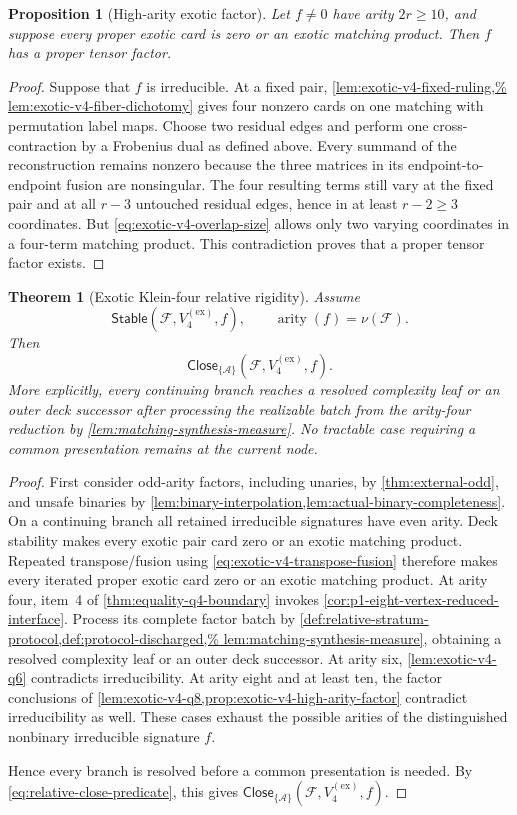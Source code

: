 \documentclass[11pt,letterpaper,onecolumn]{article}
\theoremstyle{plain}
\newtheorem{theorem}{Theorem}[section]
\newtheorem{proposition}[proposition]{Proposition}
\theoremstyle{definition}
\theoremstyle{remark}
\newcommand{\cF}{\mathcal F}
\newcommand{\cA}{\mathscr A}
\newcommand{\KleinEx}{{V_4^{(\mathrm{ex})}}}
\newcommand{\Stable}{\mathsf{Stable}}
\newcommand{\Close}{\mathsf{Close}}
\newcommand{\arity}{\operatorname{arity}}
\begin{document}
\begin{proposition}[High-arity exotic factor]
\label{prop:exotic-v4-high-arity-factor}
Let \(f\ne0\) have arity \(2r\ge10\), and suppose every proper exotic card is
zero or an exotic matching product.  Then \(f\) has a proper
tensor factor.
\end{proposition}

\begin{proof}
Suppose that \(f\) is irreducible. At a fixed pair, \cref{lem:exotic-v4-fixed-ruling,%
lem:exotic-v4-fiber-dichotomy} gives four nonzero cards on one matching with
permutation label maps.  Choose two residual edges and perform one
cross-contraction by a Frobenius dual as defined above.  Every summand of the reconstruction remains nonzero
because the three matrices in its endpoint-to-endpoint fusion are
nonsingular.  The four resulting terms still vary at the fixed pair and at
all \(r-3\) untouched residual edges, hence in at least \(r-2\ge3\)
coordinates.  But
\cref{eq:exotic-v4-overlap-size} allows only two varying coordinates in a
four-term matching product.  This contradiction proves that a proper
tensor factor exists.
\end{proof}

\begin{theorem}[Exotic Klein-four relative rigidity]
\label{thm:exotic-v4-relative-rigidity}
Assume
\[
 \Stable(\cF,\KleinEx,f),\qquad
 \arity(f)=\nu(\cF).
\]
Then
\[
 \Close_{\{\cA\}}(\cF,\KleinEx,f).
\]
More explicitly, every continuing branch reaches a resolved complexity
leaf or an outer deck successor after processing the realizable batch
from the arity-four reduction by \cref{lem:matching-synthesis-measure}.
No tractable case requiring a common presentation remains at the current node.
\end{theorem}

\begin{proof}
First consider odd-arity factors, including unaries, by
\cref{thm:external-odd}, and unsafe binaries by
\cref{lem:binary-interpolation,lem:actual-binary-completeness}.
On a continuing branch all retained irreducible signatures have even arity.
Deck stability makes every exotic pair card zero or an exotic matching
product.  Repeated transpose/fusion using
\cref{eq:exotic-v4-transpose-fusion} therefore makes every iterated proper
exotic card zero or an exotic matching product.
At arity four, item~4 of \cref{thm:equality-q4-boundary} invokes
\cref{cor:p1-eight-vertex-reduced-interface}. Process its complete factor
batch by \cref{def:relative-stratum-protocol,def:protocol-discharged,%
lem:matching-synthesis-measure}, obtaining a resolved complexity leaf or
an outer deck successor. At arity six, \cref{lem:exotic-v4-q6}
contradicts irreducibility.
At arity eight and at least ten, the factor conclusions of
\cref{lem:exotic-v4-q8,prop:exotic-v4-high-arity-factor} contradict
irreducibility as well.  These cases exhaust the possible arities of the
distinguished nonbinary irreducible signature \(f\).

Hence every branch is resolved before a common presentation is needed.
By \cref{eq:relative-close-predicate}, this gives
\(\Close_{\{\cA\}}(\cF,\KleinEx,f)\).
\end{proof}
\end{document}
